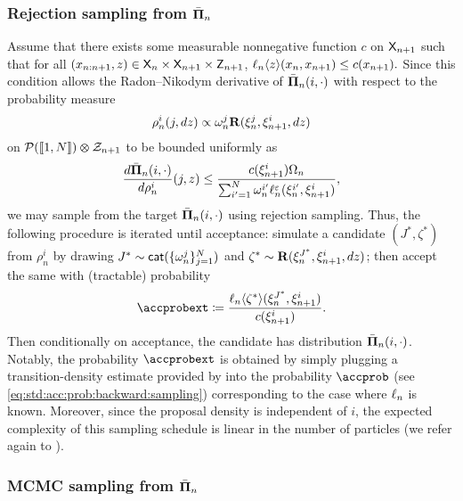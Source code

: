 \subsubsection*{Rejection sampling from $\bar{\boldsymbol{\Pi}}_{n}$} 

Assume that there exists some measurable nonnegative function $c$ on $\mathsf{X}_{n + 1}$ such that for all $(x_{n:n + 1}, z) \in \mathsf{X}_n \times \mathsf{X}_{n + 1} \times \mathsf{Z}_{n + 1}$,
$
\ell_{n} \langle z \rangle(x_n, x_{n + 1}) \leq c(x_{n + 1}).  
$
Since this condition allows the Radon--Nikodym derivative of $\bar{\boldsymbol{\Pi}}_{n}(i, \cdot)$ with respect to the probability measure 
\begin{equation} \label{eq:proposal:pm:rejection}
\rho_n^i(j, \rmd z) \propto \ewght{n}{j} \kernel{R}(\epart{n}{j}, \epart{n + 1}{i}, \rmd z)
\end{equation} 
on $\mathcal{P}(\llbracket 1, N \rrbracket) \varotimes \mathcal{Z}_{n + 1}$ to be bounded uniformly as 
$$
\frac{\rmd \trmext{n}(i, \cdot)}{\rmd \rho_n^i}(j, z) \leq \frac{c(\epart{n + 1}{i}) \sumwght{n}}{\sum_{i' = 1}^\N \ewght{n}{i'} \udmod{n}(\epart{n}{i'}, \epart{n + 1}{i})},  
$$ 
we may sample from the target $\bar{\boldsymbol{\Pi}}_{n}(i, \cdot)$ using rejection sampling. Thus, the following procedure is iterated until acceptance: simulate a candidate $(J^\ast, \zeta^\ast)$ from $\rho_n^i$ by drawing $J^\ast \sim \mathsf{cat}(\{ \omega_{n}^{j} \}_{j = 1}^N)$ and $\zeta^\ast \sim \mathbf{R}(\xi_{n}^{J^\ast}, \xi_{n + 1}^{i}, d z)$; then accept the same with (tractable) probability 
$$
\accprobext \eqdef \frac{\ukest{n}{\zeta^\ast}(\epart{n}{J^\ast}, \epart{n + 1}{i})}{c(\epart{n + 1}{i})}. 
$$ 
Then conditionally on acceptance, the candidate has distribution $\bar{\boldsymbol{\Pi}}_{n}(i, \cdot)$.  
Notably, the probability $\accprobext$ is obtained by simply plugging a transition-density estimate provided by  into the probability $\accprob$ (see \eqref{eq:std:acc:prob:backward:sampling}) corresponding to the case where $\ell_{n}$ is known. Moreover, since the proposal density is independent of $i$, the expected complexity of this sampling schedule is linear in the number of particles (we refer again to \cite{douc:garivier:moulines:olsson:2010}).  

\subsubsection*{MCMC sampling from $\bar{\boldsymbol{\Pi}}_{n}$}


